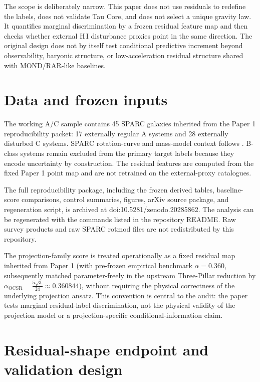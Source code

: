 \documentclass[11pt]{article}
\begin{document}
The scope is deliberately narrow. This paper does not use residuals to redefine the labels, does not validate Tau Core, and does not select a unique gravity law. It quantifies marginal discrimination by a frozen residual feature map and then checks whether external H\,I disturbance proxies point in the same direction. The original design does not by itself test conditional predictive increment beyond observability, baryonic structure, or low-acceleration residual structure shared with MOND/RAR-like baselines.

\section{Data and frozen inputs}

The working A/C sample contains 45 SPARC galaxies inherited from the Paper 1 reproducibility packet: 17 externally regular A systems and 28 externally disturbed C systems. SPARC rotation-curve and mass-model context follows \cite{Lelli2016SPARC,Lelli2016SPARCZenodo}. B-class systems remain excluded from the primary target labels because they encode uncertainty by construction. The residual features are computed from the fixed Paper 1 point map and are not retrained on the external-proxy catalogues.

The full reproducibility package, including the frozen derived tables, baseline-score comparisons, control summaries, figures, arXiv source package, and regeneration script, is archived at doi:10.5281/zenodo.20285862. The analysis can be regenerated with the commands listed in the repository README. Raw survey products and raw SPARC rotmod files are not redistributed by this repository.

The projection-family score is treated operationally as a fixed residual map inherited from Paper 1 (with pre-frozen empirical benchmark $\alpha = 0.360$, subsequently matched parameter-freely in the upstream Three-Pillar reduction by $\alpha_{\mathrm{OCSR}} = \frac{5\sqrt{3}}{24} \approx 0.360844$), without requiring the physical correctness of the underlying projection ansatz. This convention is central to the audit: the paper tests marginal residual-label discrimination, not the physical validity of the projection model or a projection-specific conditional-information claim.

\section{Residual-shape endpoint and validation design}
\end{document}
